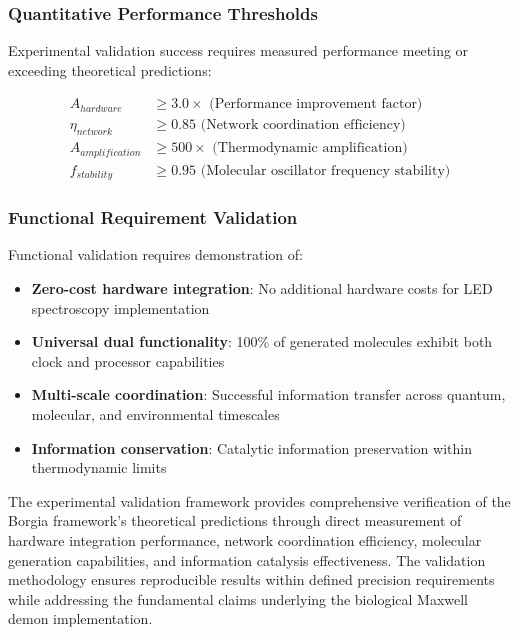\subsubsection{Quantitative Performance Thresholds}

Experimental validation success requires measured performance meeting or exceeding theoretical predictions:

\begin{align}
A_{hardware} &\geq 3.0 \times \text{ (Performance improvement factor)} \\
\eta_{network} &\geq 0.85 \text{ (Network coordination efficiency)} \\
A_{amplification} &\geq 500 \times \text{ (Thermodynamic amplification)} \\
f_{stability} &\geq 0.95 \text{ (Molecular oscillator frequency stability)}
\end{align}

\subsubsection{Functional Requirement Validation}

Functional validation requires demonstration of:

\begin{itemize}
\item \textbf{Zero-cost hardware integration}: No additional hardware costs for LED spectroscopy implementation
\item \textbf{Universal dual functionality}: 100\% of generated molecules exhibit both clock and processor capabilities
\item \textbf{Multi-scale coordination}: Successful information transfer across quantum, molecular, and environmental timescales
\item \textbf{Information conservation}: Catalytic information preservation within thermodynamic limits
\end{itemize}

The experimental validation framework provides comprehensive verification of the Borgia framework's theoretical predictions through direct measurement of hardware integration performance, network coordination efficiency, molecular generation capabilities, and information catalysis effectiveness. The validation methodology ensures reproducible results within defined precision requirements while addressing the fundamental claims underlying the biological Maxwell demon implementation.
